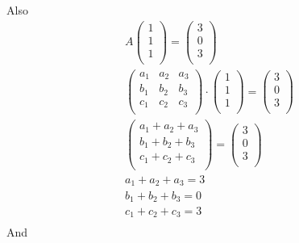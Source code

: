\documentclass{article}
\begin{document}
Also
\begin{gather*}
  A \begin{pmatrix}
      1 \\
      1 \\
      1 \\
    \end{pmatrix} = 
    \begin{pmatrix}
      3 \\
      0 \\
      3 \\
    \end{pmatrix} \\
  \begin{pmatrix}
    a_1 & a_2 & a_3 \\
    b_1 & b_2 & b_3 \\
    c_1 & c_2 & c_3 \\
  \end{pmatrix} \cdot 
  \begin{pmatrix}
    1 \\
    1 \\
    1 \\
  \end{pmatrix} = 
  \begin{pmatrix}
    3 \\
    0 \\
    3 \\
  \end{pmatrix} \\
  \begin{pmatrix}
    a_1 + a_2 + a_3 \\
    b_1 + b_2 + b_3 \\
    c_1 + c_2 + c_3 \\
  \end{pmatrix} = 
  \begin{pmatrix}
    3 \\
    0 \\
    3 \\
  \end{pmatrix} \\
  a_1 + a_2 + a_3 = 3 \\
  b_1 + b_2 + b_3 = 0 \\
  c_1 + c_2 + c_3 = 3 \\
\end{gather*}
And
\end{document}
